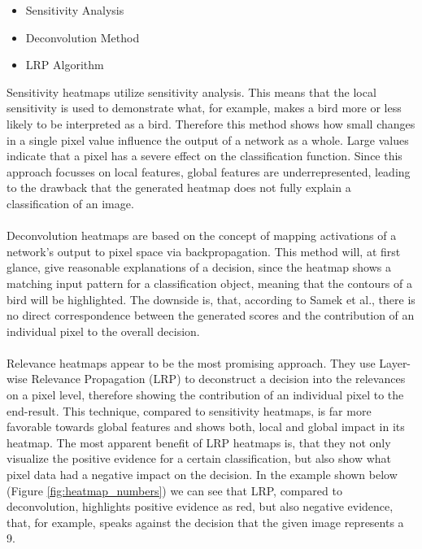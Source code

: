 \documentclass{acmsiggraph}               %
\begin{document}
\begin{itemize}
  \setlength\itemsep{0em}
  \item Sensitivity Analysis
  \item Deconvolution Method
  \item LRP Algorithm
\end{itemize}

Sensitivity heatmaps utilize sensitivity analysis. This means that the local sensitivity is used to demonstrate what, for example, makes a bird more or less likely to be interpreted as a bird. Therefore this method shows how small changes in a single pixel value influence the output of a network as a whole. Large values indicate that a pixel has a severe effect on the classification function. Since this approach focusses on local features, global features are underrepresented, leading to the drawback that the generated heatmap does not fully explain a classification of an image.\\\\
Deconvolution heatmaps are based on the concept of mapping activations of a network's output to pixel space via backpropagation. This method will, at first glance, give reasonable explanations of a decision, since the heatmap shows a matching input pattern for a classification object, meaning that the contours of a bird will be highlighted. The downside is, that, according to Samek et al., there is no direct correspondence between the generated scores and the contribution of an individual pixel to the overall decision.\\\\
Relevance heatmaps appear to be the most promising approach. They use Layer-wise Relevance Propagation (LRP) to deconstruct a decision into the relevances on a pixel level, therefore showing the contribution of an individual pixel to the end-result. This technique, compared to sensitivity heatmaps, is far more favorable towards global features and shows both, local and global impact in its heatmap. The most apparent benefit of LRP heatmaps is, that they not only visualize the positive evidence for a certain classification, but also show what pixel data had a negative impact on the decision. In the example shown below (Figure \ref{fig:heatmap_numbers}) we can see that LRP, compared to deconvolution, highlights positive evidence as red, but also negative evidence, that, for example, speaks against the decision that the given image represents a 9.
\end{document}
